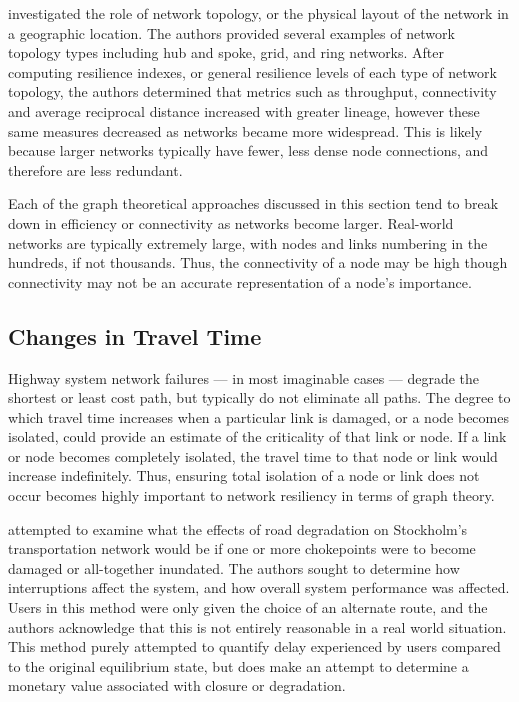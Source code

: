 \citet{zhang2015} investigated the role of network topology, or the physical
layout of the network in a geographic location.
The authors provided several examples of network topology types including
hub and spoke, grid, and
ring networks. After computing resilience indexes, or general resilience
levels of each type of
network topology, the authors determined that metrics such as throughput,
connectivity and average
reciprocal distance increased with greater lineage, however these same measures decreased as
networks became
more widespread. This is likely because larger networks typically have fewer, less dense node
connections, and
therefore are less redundant.

Each of the graph theoretical approaches discussed in this section tend to break
down in efficiency or connectivity as networks become larger. Real-world
networks are typically extremely large, with nodes and links numbering in the
hundreds, if not thousands. Thus, the connectivity of a node may be high though
connectivity may not be an accurate representation of a node's importance.

\subsection{Changes in Travel Time}

Highway system network failures --- in most imaginable cases --- degrade
the
shortest or least cost path, but typically do not eliminate all paths.
The degree
to which travel time increases when a particular link is damaged, or a node
becomes isolated, could
provide an estimate of the criticality of that link or node. If a link or node
becomes completely isolated, the travel time to that node or link would
increase indefinitely. Thus, ensuring total isolation of a node or link does
not occur becomes highly important to network resiliency in terms of graph theory.

\citet{Berdica2007} attempted to examine what the effects of road
degradation on Stockholm's transportation network would be if one or more
chokepoints were to become damaged or all-together inundated. The authors
sought to determine how interruptions affect the system, and how overall
system performance was affected. Users in this method were only given the
choice of an alternate route, and the authors acknowledge that this is not
entirely reasonable in a real world situation. This method purely attempted
to quantify delay experienced by users compared to the original
equilibrium state, but does make an attempt to determine a monetary value
associated with closure or degradation.

